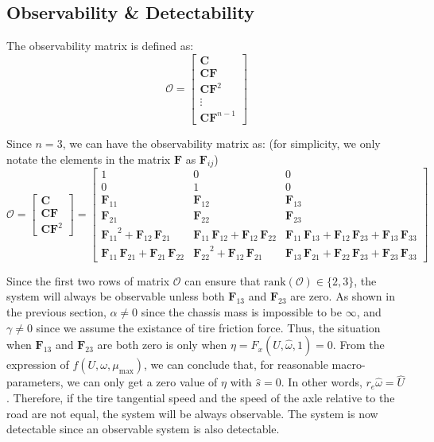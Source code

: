 \documentclass[letterpaper,12pt]{article}
\begin{document}
\subsection*{Observability \& Detectability}
The observability matrix is defined as:
\begin{equation*}
\mathcal {O}=
\begin{bmatrix}
\mathbf{C}\\ \mathbf{C}\mathbf{F}\\ \mathbf{C}\mathbf{F}^{2}\\\vdots \\ \mathbf{C}\mathbf{F}^{n-1}
\end{bmatrix}
\end{equation*}
\par
Since $n=3$, we can have the observability matrix as: (for simplicity, we only notate the elements in the matrix $\mathbf{F}$ as $\mathbf{F}_{ij}$)
\begin{equation*}
\mathcal {O}=
\begin{bmatrix}
\mathbf{C}\\
\mathbf{C}\mathbf{F}\\
\mathbf{C}\mathbf{F}^{2}
\end{bmatrix}
=\left[
\begin{array}{ccc} 1 & 0 & 0\\
0 & 1 & 0\\ 
\mathbf{F}_{11} & \mathbf{F}_{12} & \mathbf{F}_{13}\\ 
\mathbf{F}_{21} & \mathbf{F}_{22} & \mathbf{F}_{23}\\ 
{\mathbf{F}_{11}}^2+\mathbf{F}_{12}\,\mathbf{F}_{21} & \mathbf{F}_{11}\,\mathbf{F}_{12}+\mathbf{F}_{12}\,\mathbf{F}_{22} & \mathbf{F}_{11}\,\mathbf{F}_{13}+\mathbf{F}_{12}\,\mathbf{F}_{23}+\mathbf{F}_{13}\,\mathbf{F}_{33}\\ 
\mathbf{F}_{11}\,\mathbf{F}_{21}+\mathbf{F}_{21}\,\mathbf{F}_{22} & {\mathbf{F}_{22}}^2+\mathbf{F}_{12}\,\mathbf{F}_{21} & \mathbf{F}_{13}\,\mathbf{F}_{21}+\mathbf{F}_{22}\,\mathbf{F}_{23}+\mathbf{F}_{23}\,\mathbf{F}_{33} 
\end{array}\right]
\end{equation*}
\par
Since the first two rows of matrix $\mathcal {O}$ can ensure that $\mathrm{rank}\left(\mathcal {O}\right) \in \{2,3\}$, the system will always be observable unless both $\mathbf{F}_{13}$ and $\mathbf{F}_{23}$ are zero. As shown in the previous section, $\alpha \neq 0$ since the chassis mass is impossible to be $\infty$, and $\gamma \neq 0$ since we assume the existance of tire friction force. Thus, the situation when $\mathbf{F}_{13}$ and $\mathbf{F}_{23}$ are both zero is only when $\eta=F_x (\hat{U},\hat{\omega},1)=0$. From the expression of $f (U,\omega,\mu_{\max}) $, we can conclude that, for reasonable macro-parameters, we can only get a zero value of $\eta$ with $\hat{s}=0$. In other words, $r_e\hat{\omega} = \hat{U}$. Therefore, if the tire tangential speed and the speed of the axle relative to the road are not equal, the system will be always observable. The system is now detectable since an observable system is also detectable.
\end{document}
